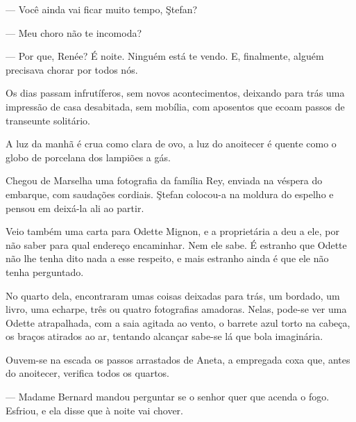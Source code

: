 
--- Você ainda vai ficar muito tempo, Ştefan?


--- Meu choro não te incomoda?

--- Por que, Renée? É noite. Ninguém está te vendo. E, finalmente,
alguém precisava chorar por todos nós.

\asterisc

Os dias passam infrutíferos, sem novos acontecimentos, deixando para
trás uma impressão de casa desabitada, sem mobília, com aposentos que
ecoam passos de transeunte solitário.

A luz da manhã é crua como clara de ovo, a luz do anoitecer é quente
como o globo de porcelana dos lampiões a gás.

Chegou de Marselha uma fotografia da família Rey, enviada na véspera do
embarque, com saudações cordiais. Ştefan colocou-a na moldura do espelho
e pensou em deixá-la ali ao partir.

Veio também uma carta para Odette Mignon, e a proprietária a deu a ele,
por não saber para qual endereço encaminhar. Nem ele sabe. É estranho
que Odette não lhe tenha dito nada a esse respeito, e mais estranho
ainda é que ele não tenha perguntado.

No quarto dela, encontraram umas coisas deixadas para trás, um bordado,
um livro, uma echarpe, três ou quatro fotografias amadoras. Nelas,
pode-se ver uma Odette atrapalhada, com a saia agitada ao vento, o
barrete azul torto na cabeça, os braços atirados ao ar, tentando
alcançar sabe-se lá que bola imaginária.


Ouvem-se na escada os passos arrastados de Aneta, a empregada coxa que,
antes do anoitecer, verifica todos os quartos.

--- Madame Bernard mandou perguntar se o senhor quer que acenda o fogo.
Esfriou, e ela disse que à noite vai chover.

